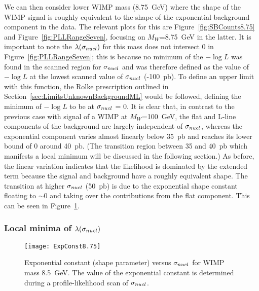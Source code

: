 We can then consider lower WIMP mass (8.75~GeV) where the shape of the WIMP signal is roughly equivalent to the shape of the exponential background component in the data.  The relevant plots for this are Figure~\ref{fig:SBCounts8.75} and Figure~\ref{fig:PLLRangeSeven}, focusing on $M_{W}$=8.75~GeV in the latter.  It is important to note the $\lambda(\sigma_{nucl})$ for this mass does not intersect 0 in Figure~\ref{fig:PLLRangeSeven}; this is because no minimum of the $-\log L$ was found in the scanned region for $\signuc$ and was therefore defined as the value of $-\log L$ at the lowest scanned value of $\signuc$ (-100~pb).  To define an upper limit with this function, the Rolke prescription outlined in Section~\ref{sec:LimitsUnknownBackgroundML} would be followed, defining the minimum of $-\log L$ to be at $\signuc$ = 0.  It is clear that, in contrast to the previous case with signal of a WIMP at $M_{W}$=100~GeV, the flat and L-line components of the background are largely independent of $\signuc$, whereas the exponential component varies almost linearly below 35~pb and reaches its lower bound of 0 around 40~pb.  (The transition region between 35 and 40~pb which manifests a local minimum will be discussed in the following section.)  As before, the linear variation indicates that the likelihood is dominated by the extended term because the signal and background have a roughly equivalent shape.  The transition at higher $\signuc$ (50~pb) is due to the exponential shape constant floating to  $\sim0$ and taking over the contributions from the flat component.  This can be seen in Figure~\ref{fig:FitExpoShapeVsSigma}.
	
		\subsubsection{Local minima of \texorpdfstring{$\lambda(\sigma_{nucl})$}{profile-likelihood function}}
		\label{sec:LLPathoLocalMinima}
			
			\begin{figure}
				\centering
				\texttt{[image: ExpConst8.75]}
				\caption[Exponential constant (shape parameter) versus $\signuc$]
				{Exponential constant (shape parameter) versus $\signuc$ for WIMP mass 8.5~GeV.
				The value of the exponential constant is determined during a profile-likelihood scan
				of $\signuc$.}
				\label{fig:FitExpoShapeVsSigma}
			\end{figure}
	
